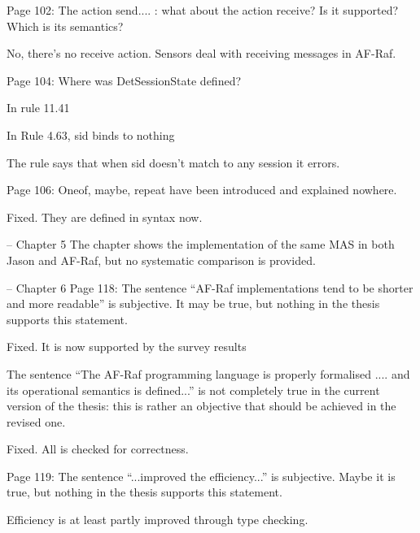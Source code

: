 \documentclass{article}
\newcommand{\todo}[1]{[\textcolor{green}{TODO}: #1]}
\newenvironment{them}{\noindent\begingroup\color{blue}}{\endgroup\par}
\begin{document}
\begin{them}

Page 102:
The action send.... : what about the action receive? Is it supported? Which is
its semantics?

\end{them}
No, there's no receive action. Sensors deal with receiving messages in AF-Raf.

\begin{them}

Page 104:
Where was DetSessionState defined?
\end{them}
In rule 11.41

\begin{them}

In Rule 4.63, sid binds to nothing
\end{them}
The rule says that when sid doesn't match to any session it errors.

\begin{them}

Page 106:
Oneof, maybe, repeat have been introduced and explained nowhere.
\end{them}
Fixed. They are defined in syntax now.

\begin{them}

-- Chapter 5
The chapter shows the implementation of the same MAS in both Jason and AF-Raf,
but no systematic comparison is provided.

\end{them}
\todo{}

\begin{them}

-- Chapter 6
Page 118:
The sentence ``AF-Raf implementations tend to be shorter and more readable'' is
subjective. It may be true, but nothing in the thesis supports this statement.

\end{them}
Fixed. It is now supported by the survey results

\begin{them}

The sentence ``The AF-Raf programming language is properly formalised .... and
its operational semantics is defined...'' is not completely true in the current
version of the thesis: this is rather an objective that should be achieved in
the revised one.

\end{them}
Fixed. All is checked for correctness.

\begin{them}

Page 119:
The sentence ``...improved the efficiency...'' is subjective. Maybe it is true,
but nothing in the thesis supports this statement.

\end{them}
Efficiency is at least partly improved through type checking.
\end{document}

